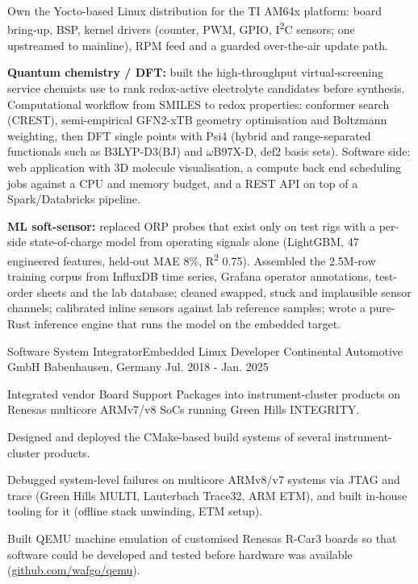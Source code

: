 \begin{cventries}
{\begin{cvitems}
        \item {Own the Yocto-based Linux distribution for the TI AM64x platform: board bring-up, BSP, kernel drivers (counter, PWM, GPIO, I\textsuperscript{2}C sensors; one upstreamed to mainline), RPM feed and a guarded over-the-air update path.}
        \item {\textbf{Quantum chemistry / DFT:} built the high-throughput virtual-screening service chemists use to rank redox-active electrolyte candidates before synthesis. Computational workflow from SMILES to redox properties: conformer search (CREST), semi-empirical GFN2-xTB geometry optimisation and Boltzmann weighting, then DFT single points with Psi4 (hybrid and range-separated functionals such as B3LYP-D3(BJ) and \(\omega\)B97X-D, def2 basis sets). Software side: web application with 3D molecule visualisation, a compute back end scheduling jobs against a CPU and memory budget, and a REST API on top of a Spark/Databricks pipeline.}
        \item {\textbf{ML soft-sensor:} replaced ORP probes that exist only on test rigs with a per-side state-of-charge model from operating signals alone (LightGBM, 47 engineered features, held-out MAE 8\%, R\textsuperscript{2} 0.75). Assembled the 2.5M-row training corpus from InfluxDB time series, Grafana operator annotations, test-order sheets and the lab database; cleaned swapped, stuck and implausible sensor channels; calibrated inline sensors against lab reference samples; wrote a pure-Rust inference engine that runs the model on the embedded target.}
      \end{cvitems}
    }

  \cventry
    {Software System Integrator{\enskip\cdotp\enskip}Embedded Linux Developer} %
    {Continental Automotive GmbH} %
    {Babenhausen, Germany} %
    {Jul. 2018 - Jan. 2025} %
    {
      \begin{cvitems} %
        \item {Integrated vendor Board Support Packages into instrument-cluster products on Renesas multicore ARMv7/v8 SoCs running Green Hills INTEGRITY.}
        \item {Designed and deployed the CMake-based build systems of several instrument-cluster products.}
        \item {Debugged system-level failures on multicore ARMv8/v7 systems via JTAG and trace (Green Hills MULTI, Lauterbach Trace32, ARM ETM), and built in-house tooling for it (offline stack unwinding, ETM setup).}
        \item {Built QEMU machine emulation of customised Renesas R-Car3 boards so that software could be developed and tested before hardware was available (\href{https://github.com/wafgo/qemu/tree/rcar3_port}{github.com/wafgo/qemu}).}
      \end{cvitems}
    }


\end{cventries}
